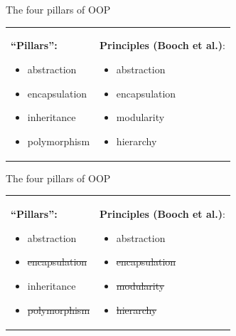 \documentclass{beamer}
\begin{document}
\begin{frame}{The four pillars of OOP}
  \begin{tabularx}{\textwidth}{ X X }
    \textbf{``Pillars'':} \pause \newline
    \begin{itemize}
    \item abstraction \pause
    \item encapsulation \pause
    \item inheritance \pause
    \item polymorphism \pause
    \end{itemize}
    &
    \textbf{Principles (Booch et al.)}: \pause \newline
    \begin{itemize}
    \item abstraction \pause
    \item encapsulation \pause
    \item modularity \pause
    \item hierarchy
    \end{itemize}
  \end{tabularx}
\end{frame}

\begin{frame}{The four pillars of OOP}
  \begin{tabularx}{\textwidth}{ X X }
    \textbf{``Pillars'':} \newline
    \begin{itemize}
    \item abstraction
    \item \sout{encapsulation}
    \item inheritance
    \item \sout{polymorphism}
    \end{itemize}
    &
    \textbf{Principles (Booch et al.)}: \newline
    \begin{itemize}
    \item abstraction
    \item \sout{encapsulation}
    \item \sout{modularity}
    \item \sout{hierarchy}
    \end{itemize}
  \end{tabularx}
\end{frame}


%

%
\end{document}
